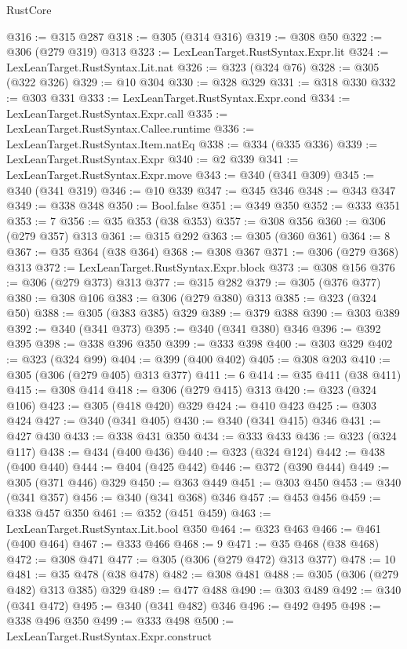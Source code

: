 \begin{lexlean}{RustCore}
\begin{coremodule}
@316 := @315 @287
@318 := @305 (@314 @316)
@319 := @308 @50
@322 := @306 (@279 @319) @313
@323 := LexLeanTarget.RustSyntax.Expr.lit
@324 := LexLeanTarget.RustSyntax.Lit.nat
@326 := @323 (@324 @76)
@328 := @305 (@322 @326)
@329 := @10 @304
@330 := @328 @329
@331 := @318 @330
@332 := @303 @331
@333 := LexLeanTarget.RustSyntax.Expr.cond
@334 := LexLeanTarget.RustSyntax.Expr.call
@335 := LexLeanTarget.RustSyntax.Callee.runtime
@336 := LexLeanTarget.RustSyntax.Item.natEq
@338 := @334 (@335 @336)
@339 := LexLeanTarget.RustSyntax.Expr
@340 := @2 @339
@341 := LexLeanTarget.RustSyntax.Expr.move
@343 := @340 (@341 @309)
@345 := @340 (@341 @319)
@346 := @10 @339
@347 := @345 @346
@348 := @343 @347
@349 := @338 @348
@350 := Bool.false
@351 := @349 @350
@352 := @333 @351
@353 := 7
@356 := @35 @353 (@38 @353)
@357 := @308 @356
@360 := @306 (@279 @357) @313
@361 := @315 @292
@363 := @305 (@360 @361)
@364 := 8
@367 := @35 @364 (@38 @364)
@368 := @308 @367
@371 := @306 (@279 @368) @313
@372 := LexLeanTarget.RustSyntax.Expr.block
@373 := @308 @156
@376 := @306 (@279 @373) @313
@377 := @315 @282
@379 := @305 (@376 @377)
@380 := @308 @106
@383 := @306 (@279 @380) @313
@385 := @323 (@324 @50)
@388 := @305 (@383 @385) @329
@389 := @379 @388
@390 := @303 @389
@392 := @340 (@341 @373)
@395 := @340 (@341 @380) @346
@396 := @392 @395
@398 := @338 @396 @350
@399 := @333 @398
@400 := @303 @329
@402 := @323 (@324 @99)
@404 := @399 (@400 @402)
@405 := @308 @203
@410 := @305 (@306 (@279 @405) @313 @377)
@411 := 6
@414 := @35 @411 (@38 @411)
@415 := @308 @414
@418 := @306 (@279 @415) @313
@420 := @323 (@324 @106)
@423 := @305 (@418 @420) @329
@424 := @410 @423
@425 := @303 @424
@427 := @340 (@341 @405)
@430 := @340 (@341 @415) @346
@431 := @427 @430
@433 := @338 @431 @350
@434 := @333 @433
@436 := @323 (@324 @117)
@438 := @434 (@400 @436)
@440 := @323 (@324 @124)
@442 := @438 (@400 @440)
@444 := @404 (@425 @442)
@446 := @372 (@390 @444)
@449 := @305 (@371 @446) @329
@450 := @363 @449
@451 := @303 @450
@453 := @340 (@341 @357)
@456 := @340 (@341 @368) @346
@457 := @453 @456
@459 := @338 @457 @350
@461 := @352 (@451 @459)
@463 := LexLeanTarget.RustSyntax.Lit.bool @350
@464 := @323 @463
@466 := @461 (@400 @464)
@467 := @333 @466
@468 := 9
@471 := @35 @468 (@38 @468)
@472 := @308 @471
@477 := @305 (@306 (@279 @472) @313 @377)
@478 := 10
@481 := @35 @478 (@38 @478)
@482 := @308 @481
@488 := @305 (@306 (@279 @482) @313 @385) @329
@489 := @477 @488
@490 := @303 @489
@492 := @340 (@341 @472)
@495 := @340 (@341 @482) @346
@496 := @492 @495
@498 := @338 @496 @350
@499 := @333 @498
@500 := LexLeanTarget.RustSyntax.Expr.construct

\end{coremodule}
\end{lexlean}
